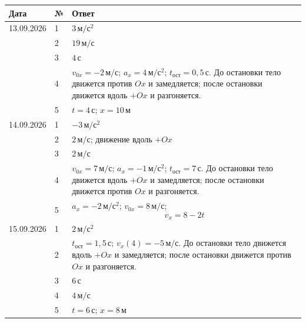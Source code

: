 \documentclass[a4paper,12pt]{article}
\begin{document}
\begin{center}
\begin{tabularx}{\linewidth}{@{}p{25mm}p{11mm}X@{}}
\toprule
Дата & № & Ответ \\
\midrule

13.09.2026
& 1
& \(3\,\text{м}/\text{с}^2\) \\

& 2
& \(19\,\text{м}/\text{с}\) \\

& 3
& \(4\,\text{с}\) \\

& 4
& \(v_{0x}=-2\,\text{м}/\text{с}\);
\(a_x=4\,\text{м}/\text{с}^2\);
\(t_{\text{ост}}=0{,}5\,\text{с}\).
До остановки тело движется против \(Ox\) и замедляется; после остановки движется вдоль \(+Ox\) и разгоняется. \\

& 5
& \(t=4\,\text{с}\);
\(x=10\,\text{м}\) \\

\midrule

14.09.2026
& 1
& \(-3\,\text{м}/\text{с}^2\) \\

& 2
& \(2\,\text{м}/\text{с}\);
движение вдоль \(+Ox\) \\

& 3
& \(2\,\text{м}/\text{с}\) \\

& 4
& \(v_{0x}=7\,\text{м}/\text{с}\);
\(a_x=-1\,\text{м}/\text{с}^2\);
\(t_{\text{ост}}=7\,\text{с}\).
До остановки тело движется вдоль \(+Ox\) и замедляется; после остановки движется против \(Ox\) и разгоняется. \\

& 5
& \(a_x=-2\,\text{м}/\text{с}^2\);
\(v_{0x}=8\,\text{м}/\text{с}\);
\[
v_x=8-2t
\]
\\

\midrule

15.09.2026
& 1
& \(2\,\text{м}/\text{с}^2\) \\

& 2
& \(t_{\text{ост}}=1{,}5\,\text{с}\);
\(v_x(4)=-5\,\text{м}/\text{с}\).
До остановки тело движется вдоль \(+Ox\) и замедляется; после остановки движется против \(Ox\) и разгоняется. \\

& 3
& \(6\,\text{с}\) \\

& 4
& \(4\,\text{м}/\text{с}\) \\

& 5
& \(t=6\,\text{с}\);
\(x=8\,\text{м}\) \\

\bottomrule
\end{tabularx}
\end{center}
\end{document}
